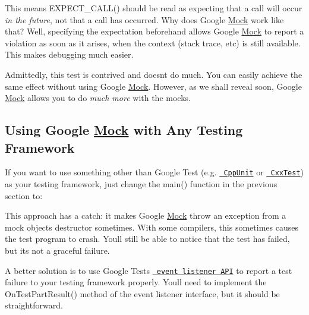 This means {\ttfamily E\+X\+P\+E\+C\+T\+\_\+\+C\+A\+L\+L()} should be read as expecting that a call will occur {\itshape in the future}, not that a call has occurred. Why does Google \mbox{\hyperlink{class_mock}{Mock}} work like that? Well, specifying the expectation beforehand allows Google \mbox{\hyperlink{class_mock}{Mock}} to report a violation as soon as it arises, when the context (stack trace, etc) is still available. This makes debugging much easier.

Admittedly, this test is contrived and doesn\textquotesingle{}t do much. You can easily achieve the same effect without using Google \mbox{\hyperlink{class_mock}{Mock}}. However, as we shall reveal soon, Google \mbox{\hyperlink{class_mock}{Mock}} allows you to do {\itshape much more} with the mocks.

\subsection*{Using Google \mbox{\hyperlink{class_mock}{Mock}} with Any Testing Framework}

If you want to use something other than Google Test (e.\+g. \href{http://apps.sourceforge.net/mediawiki/cppunit/index.php?title=Main_Page}\texttt{ Cpp\+Unit} or \href{http://cxxtest.tigris.org/}\texttt{ Cxx\+Test}) as your testing framework, just change the {\ttfamily main()} function in the previous section to\+: 
\begin{DoxyCode}{0}
\DoxyCodeLine{\}}
\end{DoxyCode}


This approach has a catch\+: it makes Google \mbox{\hyperlink{class_mock}{Mock}} throw an exception from a mock object\textquotesingle{}s destructor sometimes. With some compilers, this sometimes causes the test program to crash. You\textquotesingle{}ll still be able to notice that the test has failed, but it\textquotesingle{}s not a graceful failure.

A better solution is to use Google Test\textquotesingle{}s \href{http://code.google.com/p/googletest/wiki/GoogleTestAdvancedGuide#Extending_Google_Test_by_Handling_Test_Events}\texttt{ event listener A\+PI} to report a test failure to your testing framework properly. You\textquotesingle{}ll need to implement the {\ttfamily On\+Test\+Part\+Result()} method of the event listener interface, but it should be straightforward.

